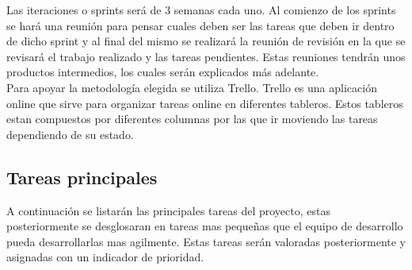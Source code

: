 
Las iteraciones o sprints será de 3 semanas cada uno. Al comienzo de los sprints se hará una reunión para pensar cuales deben ser las tareas que deben ir dentro de dicho sprint y al final del mismo se realizará la reunión de revisión en la que se revisará el trabajo realizado y las tareas pendientes. Estas reuniones tendrán unos productos intermedios, los cuales serán explicados más adelante.\\

Para apoyar la metodología elegida se utiliza Trello. Trello es una aplicación online que sirve para organizar tareas online en diferentes tableros. Estos tableros estan compuestos por diferentes columnas por las que ir moviendo las tareas dependiendo de su estado.

\subsection{Tareas principales}
A continuación se listarán las principales tareas del proyecto, estas posteriormente se desglosaran en tareas mas pequeñas que el equipo de desarrollo pueda desarrollarlas mas agilmente. Estas tareas serán valoradas posteriormente y asignadas con un indicador de prioridad.

